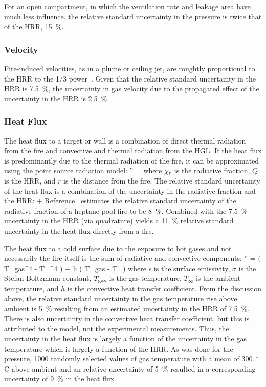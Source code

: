 For an open compartment, in which the ventilation rate and leakage area have much less influence, the relative standard uncertainty in the pressure is twice that of the HRR, 15~\%. 

\subsubsection{Velocity}

Fire-induced velocities, as in a plume or ceiling jet, are roughtly proportional to the HRR to the 1/3 power~\cite{SFPE:Alpert}. Given that the relative standard uncertainty in the HRR is 7.5~\%, the uncertainty in gas velocity due to the propagated effect of the uncertainty in the HRR is 2.5~\%.

\subsubsection{Heat Flux}

The heat flux to a target or wall is a combination of direct thermal radiation from the fire and convective and thermal radiation from the HGL. If the heat flux is predominantly due to the thermal radiation of the fire, it can be approximated using the point source radiation model:
\be
   '' = 
\ee
where $\chi_{\rm r}$ is the radiative fraction, $\dot{Q}$ is the HRR, and $r$ is the distance from the fire. The relative standard uncertainty of the heat flux is a combination of the uncertainty in the radiative fraction and the HRR:
\be
    \approx {} + 
\ee
Reference~\cite{Hamins:SP1013-1} estimates the relative standard uncertainty of the radiative fraction of a heptane pool fire to be 8~\%. Combined with the 7.5~\% uncertainty in the HRR (via quadrature) yields a 11~\% relative standard uncertainty in the heat flux directly from a fire.

The heat flux to a cold surface due to the exposure to hot gases and not necessarily the fire itself is the sum of radiative and convective components:
\be
   '' = \epsilon \sigma \left( T_{\rm gas}^4 - T_\infty^4 \right) + h \left( T_{\rm gas} - T_\infty \right)
\ee
where $\epsilon$ is the surface emissivity, $\sigma$ is the Stefan-Boltzmann constant, $T_{\rm gas}$  is the gas temperature, $T_\infty$ is the ambient temperature, and $h$ is the convective heat transfer coefficient. From the discussion above, the relative standard uncertainty in the gas temperature rise above ambient is 5~\% resulting from an estimated uncertainty in the HRR of 7.5~\%. There is also uncertainty in the convective heat transfer coefficient, but this is attributed to the model, not the experimental measurements. Thus, the uncertainty in the heat flux is largely a function of the uncertainty in the gas temperature which is largely a function of the HRR. As was done for the pressure, 1000 randomly selected values of gas temperature with a mean of 300~$^\circ$C above ambient and an relative uncertainty of 5~\% resulted in a corresponding uncertainty of 9~\% in the heat flux.

